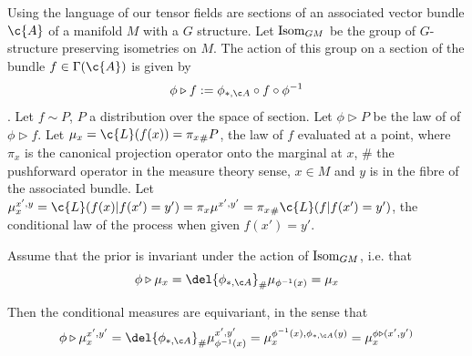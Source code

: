 \begin{theorem}
	Using the language of \textcite{weiler2021coordinate} our tensor fields are sections of an associated vector bundle $\c{A}$ of a manifold $M$ with a $G$ structure.
	Let $\operatorname{Isom}_{GM}$ be the group of $G$-structure preserving isometries on $M$.
	The action of this group on a section of the bundle $f \in \Gamma(\c{A})$ is given by \[ \phi \triangleright f := \phiA \circ f \circ \phi^{-1} \] \cite{weiler2021coordinate}.
	Let $f \sim P$, $P$ a distribution over the space of section.
	Let $\phi \triangleright P$ be the law of of $\phi \triangleright f$.
	Let $\mu_x = \c{L}(f(x)) = {\pi_x}_\# P$, the law of $f$ evaluated at a point, where $\pi_x$ is the canonical projection operator onto the marginal at $x$, $\#$ the pushforward operator in the measure theory sense, $x\in M$ and $y$ is in the fibre of the associated bundle.
	Let $\mu_x^{x', y} = \c{L}(f(x) | f(x') = y') = {\pi_x} \mu^{x', y'} = {\pi_x}_{\#} \c{L}(f | f(x') = y')$, the conditional law of the process when given $f(x') = y'$.

	Assume that the prior is invariant under the action of $\operatorname{Isom}_{GM}$, i.e. that \[\phi \triangleright \mu_x = \del{\phiA}_\# \mu_{\phi^{-1}(x)} = \mu_x\] 

	Then the conditional measures are equivariant, in the sense that \[\phi \triangleright \mu_x^{x', y'} = \del{\phiA}_\#\mu_{\phi^{-1}(x)}^{x',y'} = \mu_x^{\phi^{-1}(x), \phiA(y)} = \mu_x^{\phi \triangleright (x', y')}\] 

\end{theorem} 

